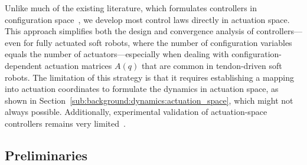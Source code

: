 Unlike much of the existing literature, which formulates controllers in configuration space~\citep{della2020model, della2023model, caasenbrood2021energy}, we develop most control laws directly in actuation space. This approach simplifies both the design and convergence analysis of controllers—even for fully actuated soft robots, where the number of configuration variables equals the number of actuators—especially when dealing with configuration-dependent actuation matrices $A(q)$ that are common in tendon-driven soft robots. 
The limitation of this strategy is that it requires establishing a mapping into actuation coordinates to formulate the dynamics in actuation space, as shown in Section~\ref{sub:background:dynamics:actuation_space}, which might not always possible. Additionally, experimental validation of actuation-space controllers remains very limited~\citep{pustina2025analysis, stolzle2024experimental}.

\subsection{Preliminaries}

